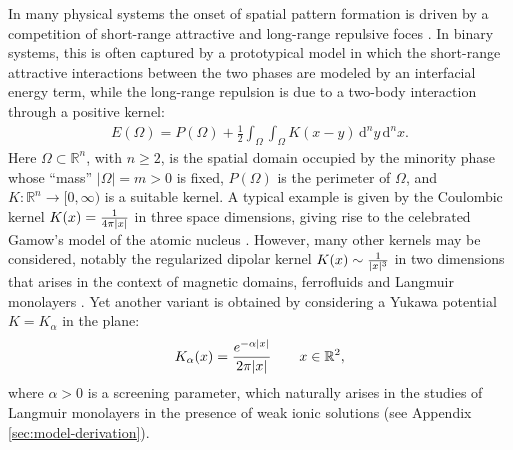 \documentclass[11pt]{article}
\numberwithin{statement}{section}
\numberwithin{equation}{section}
\theoremstyle{remark}
\newcommand{\R}{\mathbb R} 				%
\newcommand{\intd}{\, \mathrm{d}} 				%
\begin{document}
In many physical systems the onset of spatial pattern formation is
driven by a competition of short-range attractive and long-range
repulsive foces \cite{seul95,m:pre02,giuliani09a}. In binary systems,
this is often captured by a prototypical model in which the
short-range attractive interactions between the two phases are modeled
by an interfacial energy term, while the long-range repulsion is due
to a two-body interaction through a positive kernel:
\begin{align}\label{eq:nonlocal_iso_problem}
  E(\Omega) =  P(\Omega) + \frac12 \int_{\Omega}\int_{\Omega}
  K(x-y) \intd^n y \intd^n x.
\end{align}
Here $\Omega \subset \R^n$, with $n\geq2$, is the spatial domain
occupied by the minority phase whose ``mass'' $|\Omega| = m > 0$ is
fixed, $P(\Omega)$ is the perimeter \cite{ambrosio} of $\Omega$,
and $K: \mathbb R^n \to [0,\infty)$ is a suitable kernel. A typical
example is given by the Coulombic kernel $K(x) = {1 \over 4 \pi |x|}$
in three space dimensions, giving rise to the celebrated Gamow's model
of the atomic nucleus \cite{Gamow1930mass,cmt:nams17}.  However,
many other kernels may be considered, notably the regularized dipolar
kernel $K(x) \sim {1 \over |x|^3}$ in two dimensions that arises in
the context of magnetic domains, ferrofluids and Langmuir monolayers
\cite{seul95,andelman09, andelman85,mcconnell88,mcconnel91}. Yet
another variant is obtained by considering a Yukawa potential
$K = K_\alpha$ in the plane:
\begin{align}
  \label{Kalpha}
  K_\alpha(x) = {e^{-\alpha |x|} \over 2 \pi |x|} \qquad x \in \mathbb R^2,
\end{align}
where $\alpha > 0$ is a screening parameter, which naturally arises in
the studies of Langmuir monolayers in the presence of weak ionic
solutions (see Appendix \ref{sec:model-derivation}).
\end{document}
